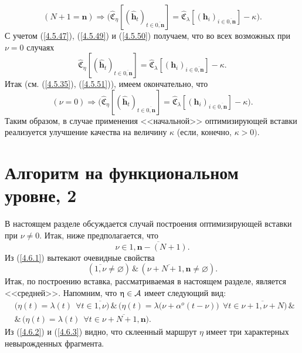 \documentclass[11pt,twoside,openany]{report}
\newcommand{\bfn}{\begin{equation}}
\newcommand{\efn}{\end{equation}}
\newcommand{\ov}{\overline}
\newcommand{\la}{\lambda}
\newcommand{\al}{\alpha}
\newcommand{\fa}{\forall}
\newcommand{\ca}{{\cal A}}
\newcommand{\emp}{\varnothing}
\begin{document}
{{$$
(N+1 = \mathbf{n}) \Longrightarrow \bigl(\widehat{\mathfrak{C}}_\eta[(\hat{\mathbf{h}}_t)_{t\in
\ov{0,\mathbf{n}}}] = \widehat{\mathfrak{C}}_\la[(\mathbf{h}_i)_{i\in\ov{0,\mathbf{n}}}] - \kappa\bigl).
$$
С учетом (\ref{4.5.47}), (\ref{4.5.49}) и (\ref{4.5.50}) получаем, что во всех возможных при $\nu=0$ случаях
\bfn\label{4.5.51}
\widehat{\mathfrak{C}}_\eta[(\hat{\mathbf{h}}_t)_{t\in\ov{0,\mathbf{n}}}] =
\widehat{\mathfrak{C}}_\la[(\mathbf{h}_i)_{i\in\ov{0,\mathbf{n}}}] - \kappa.
\efn
Итак (см. (\ref{4.5.35}), (\ref{4.5.51})), имеем окончательно, что
\bfn\label{4.5.52}(\nu=0) \Longrightarrow \bigl(\widehat{\mathfrak{C}}_\eta[(\hat{\mathbf{h}}_t)_{t\in
\ov{0,\mathbf{n}}}] = \widehat{\mathfrak{C}}_\la[(\mathbf{h}_i)_{i\in\ov{0,\mathbf{n}}}] - \kappa\bigl).
\efn
Таким образом, в случае применения <<начальной>> оптимизирующей вставки реализуется улучшение
качества на величину $\kappa$ (если, конечно, $\kappa >0).$

{\raggedright\section{
  Алгоритм на функциональном уровне, 2
}}
\label{sect:4.6}
\setcounter{equation}{0}

В настоящем разделе обсуждается случай построения оптимизирующей вставки при  $\nu \neq 0.$
Итак, ниже предполагается, что
\bfn\label{4.6.1}\nu\in \ov{1,\mathbf{n}-(N+1)}.
\efn
Из (\ref{4.6.1}) вытекают очевидные свойства
\bfn\label{4.6.2}(\ov{1,\nu}\neq \emp)\,\&\,(\ov{\nu+N+1,\mathbf{n}}\neq \emp).
\efn
Итак, по построению вставка, рассматриваемая в настоящем разделе, является <<средней>>.
Напомним, что $\eta\in \ca$ имеет следующий вид:
\begin{eqnarray}
&\bigl(\eta(t) = \la(t)\ \ \fa t\in \ov{1,\nu}\bigl)\,\&\,\bigl(\eta(t) =
\la(\nu+ \al^o(t-\nu)\bigl)\ \ \fa t\in \ov{\nu+1,\nu+N}\bigl)\,\&
&\nonumber\\
&\&\,\bigl(\eta(t)= \la(t)\ \ \fa t\in \ov{\nu+N+1,\mathbf{n}}\bigl).
&\label{4.6.3}
\end{eqnarray}
Из (\ref{4.6.2}) и (\ref{4.6.3}) видно, что склеенный маршрут $\eta$ имеет три
характерных невырожденных фрагмента.

}}
\end{document}
